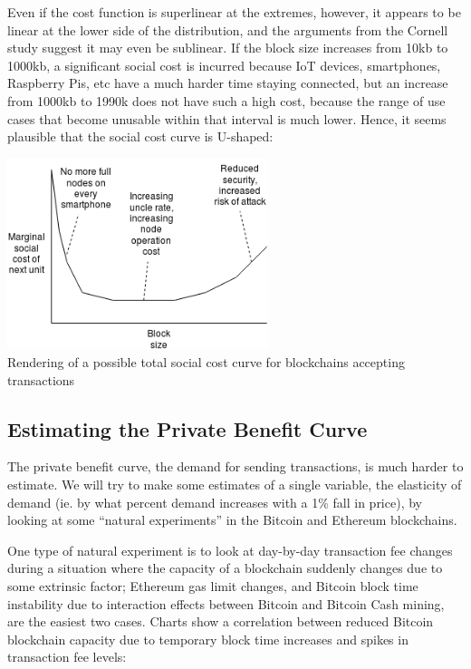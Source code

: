 \documentclass[12pt, final]{article}
\begin{document}
Even if the cost function is superlinear at the extremes, however, it appears to be linear at the lower side of the distribution, and the arguments from the Cornell study suggest it may even be sublinear. If the block size increases from 10kb to 1000kb, a significant social cost is incurred because IoT devices, smartphones, Raspberry Pis, etc have a much harder time staying connected, but an increase from 1000kb to 1990k does not have such a high cost, because the range of use cases that become unusable within that interval is much lower. Hence, it seems plausible that the social cost curve is U-shaped:

\begin{center}
\includegraphics[width=3in]{total_social_cost.png} \\
\footnotesize{Rendering of a possible total social cost curve for blockchains accepting transactions}
\label{fig:three}
\end{center}

\subsection{Estimating the Private Benefit Curve}

The private benefit curve, the demand for sending transactions, is much harder to estimate. We will try to make some estimates of a single variable, the elasticity of demand (ie. by what percent demand increases with a 1\% fall in price), by looking at some ``natural experiments'' in the Bitcoin and Ethereum blockchains.

One type of natural experiment is to look at day-by-day transaction fee changes during a situation where the capacity of a blockchain suddenly changes due to some extrinsic factor; Ethereum gas limit changes, and Bitcoin block time instability due to interaction effects between Bitcoin and Bitcoin Cash mining, are the easiest two cases. Charts show a correlation between reduced Bitcoin blockchain capacity due to temporary block time increases and spikes in transaction fee levels:
\end{document}

